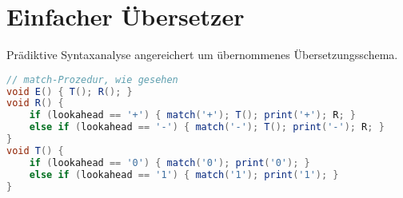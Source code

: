 \section{Einfacher Übersetzer}
Prädiktive Syntaxanalyse angereichert um übernommenes Übersetzungsschema.
\begin{lstlisting}[language=Java]
// match-Prozedur, wie gesehen
void E() { T(); R(); }
void R() { 
    if (lookahead == '+') { match('+'); T(); print('+'); R; } 
    else if (lookahead == '-') { match('-'); T(); print('-'); R; } 
}
void T() {
    if (lookahead == '0') { match('0'); print('0'); }
    else if (lookahead == '1') { match('1'); print('1'); }
}
\end{lstlisting}

